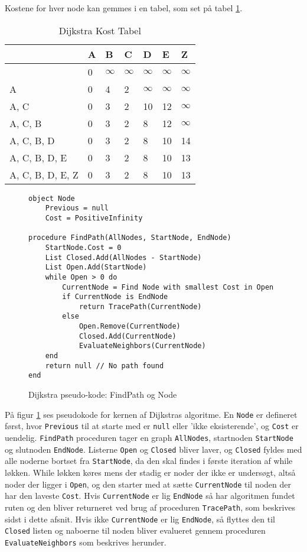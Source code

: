 Kostene for hver node kan gemmes i en tabel, som set på tabel \ref{dijktabel}.
	
\begin{table}[H]
\centering
	\begin{tabular}{|l|l|l|l|l|l|l|}
	\hline
	                 & A & B & C & D  & E  & Z  \\ \hline
	                 & 0 & $\infty$ & $\infty$ & $\infty$  & $\infty$  & $\infty$  \\ \hline
	A                & 0 & 4 & 2 & $\infty$  & $\infty$  & $\infty$  \\ \hline
	A, C             & 0 & 3 & 2 & 10 & 12 & $\infty$  \\ \hline
	A, C, B          & 0 & 3 & 2 & 8  & 12 & $\infty$  \\ \hline
	A, C, B, D       & 0 & 3 & 2 & 8  & 10 & 14 \\ \hline
	A, C, B, D, E    & 0 & 3 & 2 & 8  & 10 & 13 \\ \hline
	A, C, B, D, E, Z & 0 & 3 & 2 & 8  & 10 & 13 \\ \hline
	\end{tabular}
	\label{dijktabel}
	\caption{Dijkstra Kost Tabel}
\end{table}

\begin{figure}[H]
\begin{lstlisting}
object Node
	Previous = null
	Cost = PositiveInfinity

procedure FindPath(AllNodes, StartNode, EndNode)
	StartNode.Cost = 0
	List Closed.Add(AllNodes - StartNode)
    List Open.Add(StartNode)
    while Open > 0 do
    	CurrentNode = Find Node with smallest Cost in Open
    	if CurrentNode is EndNode
    		return TracePath(CurrentNode)
    	else
    		Open.Remove(CurrentNode)
    		Closed.Add(CurrentNode)
    		EvaluateNeighbors(CurrentNode)
    end
    return null // No path found
end
\end{lstlisting}
\caption{Dijkstra pseudo-kode: FindPath og Node}\label{DijkstraCodeFindPathNode}
\end{figure}

På figur \ref{DijkstraCodeFindPathNode} ses pseudokode for kernen af Dijkstras algoritme. En \texttt{Node} er defineret først, hvor \texttt{Previous} til at starte med er \texttt{null} eller 'ikke eksisterende', og \texttt{Cost} er uendelig. \texttt{FindPath} proceduren tager en graph \texttt{AllNodes}, startnoden \texttt{StartNode} og slutnoden \texttt{EndNode}. Listerne \texttt{Open} og \texttt{Closed} bliver laver, og \texttt{Closed} fyldes med alle noderne bortset fra \texttt{StartNode}, da den skal findes i første iteration af while løkken. While løkken køres mens der stadig er noder der ikke er undersøgt, altså noder der ligger i \texttt{Open}, og den starter med at sætte \texttt{CurrentNode} til noden der har den laveste \texttt{Cost}. Hvis \texttt{CurrentNode} er lig \texttt{EndNode} så har algoritmen fundet ruten og den bliver returneret ved brug af proceduren \texttt{TracePath}, som beskrives sidst i dette afsnit. Hvis ikke \texttt{CurrentNode} er lig \texttt{EndNode}, så flyttes den til \texttt{Closed} listen og naboerne til noden bliver evalueret gennem proceduren \texttt{EvaluateNeighbors} som beskrives herunder.

